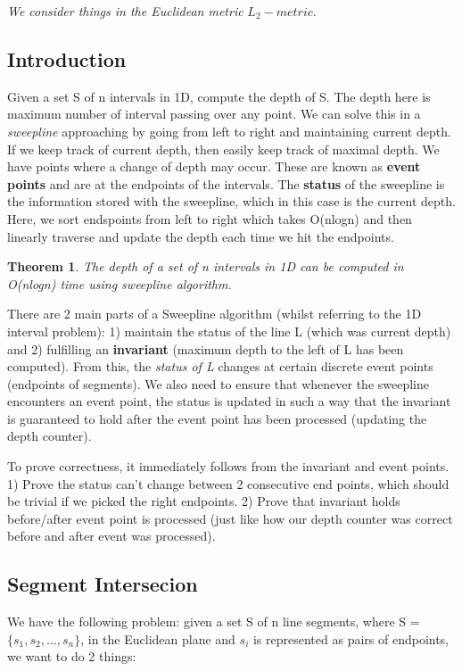 \documentclass[11pt, oneside]{article}
\newtheorem{theorem}{Theorem}
\theoremstyle{definition}
\begin{document}
\textit{We consider things in the Euclidean metric} $L_2 - metric$.

\subsection{Introduction}
Given a set S of n intervals in 1D, compute the depth of S. The depth here is maximum number of interval passing over any point. We can solve this in a \textit{sweepline} approaching by going from left to right and maintaining current depth. If we keep track of current depth, then easily keep track of maximal depth. We have points where a change of depth may occur. These are known as \textbf{event points} and are at the endpoints of the intervals. The \textbf{status} of the sweepline is the information stored with the sweepline, which in this case is the current depth. Here, we sort endspoints from left to right which takes O(nlogn) and then linearly traverse and update the depth each time we hit the endpoints.
\begin{theorem}
  The depth of a set of n intervals in 1D can be computed in O(nlogn) time using sweepline algorithm.
\end{theorem}

There are 2 main parts of a Sweepline algorithm (whilst referring to the 1D interval problem): 1) maintain the status of the line L (which was current depth) and 2) fulfilling an \textbf{invariant} (maximum depth to the left of L has been computed). From this, the \textit{status of L} changes at certain discrete event points (endpoints of segments). We also need to ensure that whenever the sweepline encounters an event point, the status is updated in such a way that the invariant is guaranteed to hold after the event point has been processed (updating the depth counter).

To prove correctness, it immediately follows from the invariant and event points. 1) Prove the status can't change between 2 consecutive end points, which should be trivial if we picked the right endpoints. 2) Prove that invariant holds before/after event point is processed (just like how our depth counter was correct before and after event was processed).

\subsection{Segment Intersecion}
We have the following problem: given a set S of n line segments, where S = $\{s_1,s_2,...,s_n\}$, in the Euclidean plane and $s_i$ is represented as pairs of endpoints, we want to do 2 things:
\end{document}
